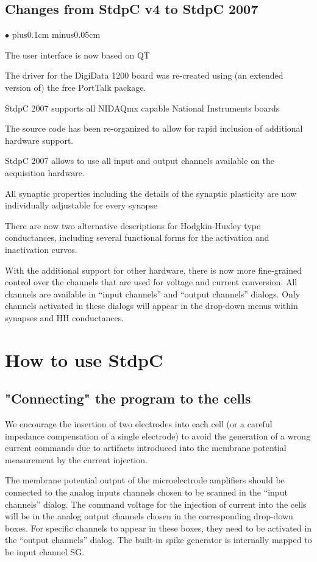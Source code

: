 \documentclass{article}
\newenvironment{myitem}{\begin{list}{$\bullet$}{\setlength{\leftmargin}{1.1em}
\itemsep0.1cm plus0.1cm minus0.05cm
\listparindent0cm
\addtolength{\labelsep}{0.5\labelsep}
\setlength{\labelwidth}{0.8em}
\setlength{\leftmargin}{\labelwidth}
\addtolength{\leftmargin}{\labelsep}
}}{\end{list}}
\begin{document}
\subsection{Changes from StdpC v4 to StdpC 2007}
\begin{myitem}
\item The user interface is now based on QT
\item The driver for the DigiData 1200 board was re-created using (an
  extended version of) the free PortTalk package.
\item StdpC 2007 supports all NIDAQmx capable National Instruments boards
\item The source code has been re-organized to allow for rapid
  inclusion of additional hardware support.
\item StdpC 2007 allows to use all input and output channels available
  on the acquisition hardware.
\item All synaptic properties including the details of the synaptic
  plasticity are now individually adjustable for every synapse
\item There are now two alternative descriptions for Hodgkin-Huxley
  type conductances, including several functional forms for the
  activation and inactivation curves.
\item With the additional support for other hardware, there is now
  more fine-grained control over the channels that are used for
  voltage and current conversion. All channels are available in
  ``input channels'' and ``output channels'' dialogs. Only channels
  activated in these dialogs will appear in the drop-down menus within
  synapses and HH conductances.
\end{myitem}

\section{How to use StdpC}

\subsection{"Connecting" the program to the cells}
 
We encourage the insertion of two electrodes into each cell (or a
careful impedance compensation of a single electrode) to avoid the
generation of a wrong current commands due to artifacts introduced
into the membrane potential measurement by the current injection.

The membrane potential output of the microelectrode amplifiers should
be connected to the analog inputs channels chosen to be scanned in the
``input channels'' dialog. The command voltage for the injection of
current into the cells will be in the analog output channels chosen in
the corresponding drop-down boxes. For specific channels to appear in
these boxes, they need to be activated in the ``output channels''
dialog. The built-in spike generator is internally mapped to be input
channel SG. 
\end{document}
